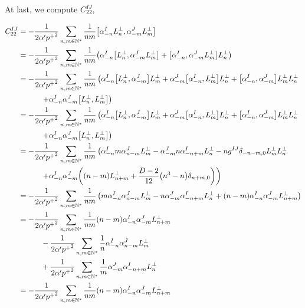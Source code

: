 At last, we compute $C_{22}^{IJ}$,

\begin{align*}
    C_{22}^{IJ}&=-\frac{1}{2\alpha'{p^+}^2}\sum\limits_{n,m\in\mathbb N^\ast}\frac{1}{nm}\comm{\alpha_{-n}^IL^\perp_n}{\alpha^J_{-m}L^\perp_m}\\
    &=-\frac{1}{2\alpha'{p^+}^2}\sum\limits_{n,m\in\mathbb N^\ast}\frac{1}{nm}\qty(\alpha_{-n}^I\comm{L^\perp_n}{\alpha^J_{-m}L^\perp_m}+\comm{\alpha_{-n}^I}{\alpha^J_{-m}L^\perp_m}L^\perp_n)\\
    &=-\frac{1}{2\alpha'{p^+}^2}\sum\limits_{n,m\in\mathbb N^\ast}\frac{1}{nm}\left(\alpha_{-n}^I\comm{L^\perp_n}{\alpha^J_{-m}}L^\perp_m+\alpha^J_{-m}\comm{\alpha_{-n}^I}{L^\perp_m}L^\perp_n+\comm{\alpha_{-n}^I}{\alpha^J_{-m}}L^\perp_mL^\perp_n\right.\\
    &\quad\quad\quad\left.+\alpha_{-n}^I\alpha^J_{-m}\comm{L^\perp_n}{L^\perp_m}\right)\\
    &=-\frac{1}{2\alpha'{p^+}^2}\sum\limits_{n,m\in\mathbb N^\ast}\frac{1}{nm}\left(\alpha_{-n}^I\comm{L^\perp_n}{\alpha^J_{-m}}L^\perp_m+\alpha^J_{-m}\comm{\alpha_{-n}^I}{L^\perp_m}L^\perp_n+\comm{\alpha_{-n}^I}{\alpha^J_{-m}}L^\perp_mL^\perp_n\right.\\
    &\quad\quad\quad\left.+\alpha_{-n}^I\alpha^J_{-m}\comm{L^\perp_n}{L^\perp_m}\right)\\
    &=-\frac{1}{2\alpha'{p^+}^2}\sum\limits_{n,m\in\mathbb N^\ast}\frac{1}{nm}\left(\alpha_{-n}^Im\alpha^J_{n-m}L^\perp_m-\alpha^J_{-m}n\alpha^I_{-n+m}L^\perp_n-ng^{IJ}\delta_{-n-m,0}L^\perp_mL^\perp_n\right.\\
    &\quad\quad\quad\left.+\alpha_{-n}^I\alpha^J_{-m}\qty(\qty(n-m)L^\perp_{n+m}+\frac{D-2}{12}\qty(n^3-n)\delta_{n+m,0})\right)\\
    &=-\frac{1}{2\alpha'{p^+}^2}\sum\limits_{n,m\in\mathbb N^\ast}\frac{1}{nm}\left(m\alpha_{-n}^I\alpha^J_{n-m}L^\perp_m-n\alpha^J_{-m}\alpha^I_{-n+m}L^\perp_n+\qty(n-m)\alpha_{-n}^I\alpha^J_{-m}L^\perp_{n+m}\right)\\
    &=-\frac{1}{2\alpha'{p^+}^2}\sum\limits_{n,m\in\mathbb N^\ast}\frac{1}{nm}\qty(n-m)\alpha_{-n}^I\alpha^J_{-m}L^\perp_{n+m}\\
    &\quad\quad\quad-\frac{1}{2\alpha'{p^+}^2}\sum\limits_{n,m\in\mathbb N^\ast}\frac{1}{n}\alpha_{-n}^I\alpha^J_{n-m}L^\perp_m\\
    &\quad\quad\quad+\frac{1}{2\alpha'{p^+}^2}\sum\limits_{n,m\in\mathbb N^\ast}\frac{1}{m}\alpha^J_{-m}\alpha^I_{-n+m}L^\perp_n\\
    &=-\frac{1}{2\alpha'{p^+}^2}\sum\limits_{n,m\in\mathbb N^\ast}\frac{1}{nm}\qty(n-m)\alpha_{-n}^I\alpha^J_{-m}L^\perp_{n+m}\\

\end{align*}
